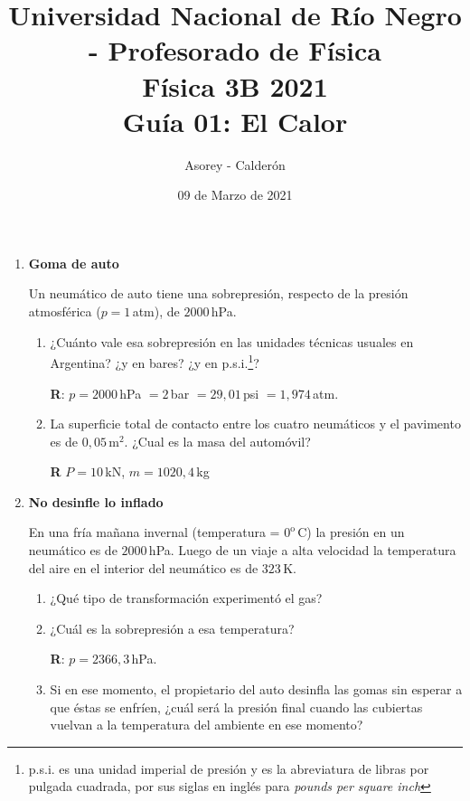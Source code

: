 \documentclass[a4paper,12pt]{article}
\begin{document}
\title{
{\normalsize{Universidad Nacional de Río Negro - Profesorado de Física}}\\
Física 3B  2021 \\ Guía 01: El Calor}
\author{Asorey - Calderón}
\date{09 de Marzo de 2021}
\maketitle

\begin{enumerate}
	\setcounter{enumi}{0}

	\item {\bf{Goma de auto}}
		
		Un neumático de auto tiene una sobrepresión, respecto de la presión
		atmosférica ($p=1$\,atm), de $2000$\,hPa.
		\begin{enumerate}
			\item ¿Cuánto vale esa sobrepresión en las unidades técnicas usuales en
				Argentina? ¿y en bares? ¿y en p.s.i.\footnote{p.s.i. es una
				unidad imperial de presión y es la abreviatura de libras por
				pulgada cuadrada, por sus siglas en inglés para {\textit{pounds
				per square inch}}}? 
				
				{\bf R}: $p=2000$\,hPa $= 2$\,bar $= 29,01$\,psi $= 1,974$\,atm.
			\item La superficie total de contacto entre los cuatro neumáticos y
				el pavimento es de $0,05$\,m$^2$. ¿Cual es la masa del
				automóvil?
				
				{\bf R} $P = 10$\,kN, $m=1020,4$\,kg
		\end{enumerate}
	
	\item {\bf{No desinfle lo inflado}}
		
		En una fría mañana invernal (temperatura = $0^\mathrm{o}$\,C) la
		presión en un neumático es de $2000$\,hPa. Luego de un viaje a alta
		velocidad la temperatura del aire en el interior del neumático es de
		$323$\,K.
		\begin{enumerate}
			\item ¿Qué tipo de transformación experimentó el gas?
			\item ¿Cuál es la sobrepresión a esa temperatura?

				{\bf R}: $p=2366,3$\,hPa.
			\item Si en ese momento, el propietario del auto desinfla las gomas
				sin esperar a que éstas se enfríen, ¿cuál será la presión final
				cuando las cubiertas vuelvan a la temperatura del ambiente en
				ese momento?


\end{enumerate}
\end{enumerate}
\end{document}
